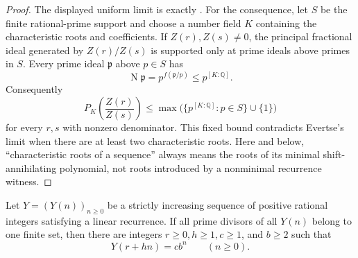 \begin{proof}
  The displayed uniform limit is exactly
  \cite[Theorem~3]{Evertse1984}. For the consequence, let \(S\) be the
  finite rational-prime support and choose a number field \(K\) containing
  the characteristic roots and coefficients. If \(Z(r),Z(s)\ne0\), the
  principal fractional ideal generated by \(Z(r)/Z(s)\) is supported
  only at prime ideals above primes in \(S\). Every prime ideal
  \(\mathfrak p\) above \(p\in S\) has
  \[
    \operatorname N\mathfrak p=p^{f(\mathfrak p/p)}
      \le p^{[K:\mathbb Q]}.
  \]
  Consequently
  \[
    P_K\!\left(\frac{Z(r)}{Z(s)}\right)
      \le \max\bigl(\{p^{[K:\mathbb Q]}:p\in S\}\cup\{1\}\bigr)
  \]
  for every \(r,s\) with nonzero denominator. This fixed bound
  contradicts Evertse's limit when there are at least two characteristic
  roots. Here and below, ``characteristic roots of a sequence'' always
  means the roots of its minimal shift-annihilating polynomial, not roots
  introduced by a nonminimal recurrence witness.
\end{proof}

\begin{lemma}
  \label{lem:s-unit-increasing-recurrence-rigidity}
  Let \(Y=(Y(n))_{n\ge0}\) be a strictly increasing sequence of positive
  rational integers satisfying a linear recurrence. If all prime
  divisors of all \(Y(n)\) belong to one finite set, then there are
  integers \(r\ge0,h\ge1,c\ge1\), and \(b\ge2\) such that
  \[
    Y(r+hn)=cb^n\qquad(n\ge0).
  \]
\end{lemma}

